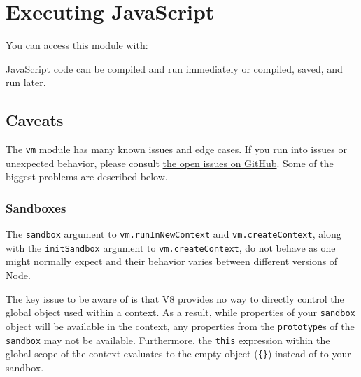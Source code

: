 \section{Executing JavaScript}

\begin{Shaded}
\begin{Highlighting}[]
\NormalTok{: } \NormalTok{- }
\end{Highlighting}
\end{Shaded}

You can access this module with:

\begin{Shaded}
\begin{Highlighting}[]
 \NormalTok{);}
\end{Highlighting}
\end{Shaded}

JavaScript code can be compiled and run immediately or compiled, saved,
and run later.

\subsection{Caveats}

The \texttt{vm} module has many known issues and edge cases. If you run
into issues or unexpected behavior, please consult
\href{https://github.com/joyent/node/search?q=vm+state\%3Aopen\&type=Issues}{the
open issues on GitHub}. Some of the biggest problems are described
below.

\subsubsection{Sandboxes}

The \texttt{sandbox} argument to \texttt{vm.runInNewContext} and
\texttt{vm.createContext}, along with the \texttt{initSandbox} argument
to \texttt{vm.createContext}, do not behave as one might normally expect
and their behavior varies between different versions of Node.

The key issue to be aware of is that V8 provides no way to directly
control the global object used within a context. As a result, while
properties of your \texttt{sandbox} object will be available in the
context, any properties from the \texttt{prototype}s of the
\texttt{sandbox} may not be available. Furthermore, the \texttt{this}
expression within the global scope of the context evaluates to the empty
object (\texttt{\{\}}) instead of to your sandbox.

